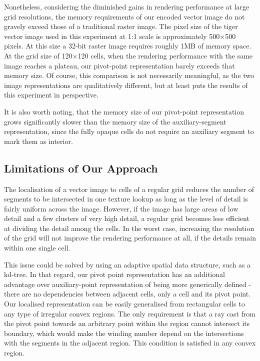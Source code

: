 \documentclass[11pt,a4paper,twoside]{article}
\begin{document}
Nonetheless, considering the diminished gains in rendering performance at large grid resolutions, the memory requirements of our encoded vector image do not gravely exceed those of a traditional raster image. The pixel size of the tiger vector image used in this experiment at 1:1 scale is approximately 500$\times$500 pixels. At this size a 32-bit raster image requires roughly 1MB of memory space. At the grid size of 120$\times$120 cells, when the rendering performance with the same image reaches a plateau, our pivot-point representation barely exceeds that memory size. Of course, this comparison is not necessarily meaningful, as the two image representations are qualitatively different, but at least puts the results of this experiment in perspective.

It is also worth noting, that the memory size of our pivot-point representation grows significantly slower than the memory size of the auxiliary-segment representation, since the fully opaque cells do not require an auxiliary segment to mark them as interior.

\subsection {Limitations of Our Approach}

The localisation of a vector image to cells of a regular grid reduces the number of segments to be intersected in one texture lookup as long as the level of detail is fairly uniform across the image. However, if the image has large areas of low detail and a few clusters of very high detail, a regular grid becomes less efficient at dividing the detail among the cells. In the worst case, increasing the resolution of the grid will not improve the rendering performance at all, if the details remain within one single cell.

This issue could be solved by using an adaptive spatial data structure, such as a kd-tree. In that regard, our pivot point representation has an additional advantage over auxiliary-point representation of being more generically defined - there are no dependencies between adjacent cells, only a cell and its pivot point. Our localised representation can be easily generalised from rectangular cells to any type of irregular convex regions. The only requirement is that a ray cast from the pivot point towards an arbitrary point within the region cannot intersect its boundary, which would make the winding number depend on the intersections with the segments in the adjacent region. This condition is satisfied in any convex region.
\end{document}
